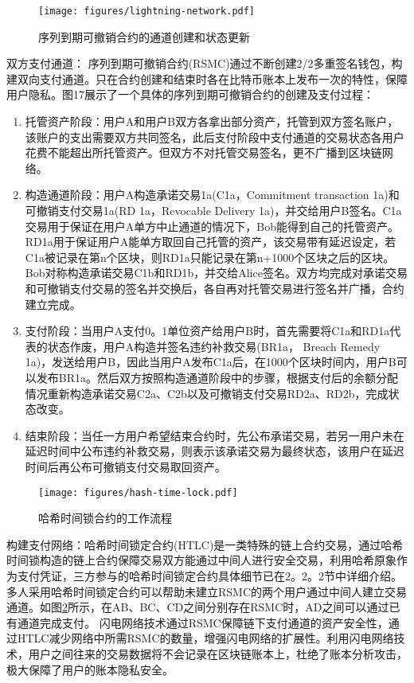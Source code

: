 \begin{figure}
\centering
\texttt{[image: figures/lightning-network.pdf]}
\caption{序列到期可撤销合约的通道创建和状态更新}
\label{fig:lightning-network}
\end{figure}

双方支付通道： 序列到期可撤销合约(RSMC)通过不断创建2/2多重签名钱包，构建双向支付通道。只在合约创建和结束时各在比特币账本上发布一次的特性，保障用户隐私。图17展示了一个具体的序列到期可撤销合约的创建及支付过程：

\begin{enumerate}
	\item 托管资产阶段：用户A和用户B双方各拿出部分资产，托管到双方签名账户，该账户的支出需要双方共同签名，此后支付阶段中支付通道的交易状态各用户花费不能超出所托管资产。但双方不对托管交易签名，更不广播到区块链网络。
	\item 构造通道阶段：用户A构造承诺交易1a(C1a，Commitment transaction 1a)和可撤销支付交易1a(RD 1a，Revocable Delivery 1a)，并交给用户B签名。C1a交易用于保证在用户A单方中止通道的情况下，Bob能得到自己的托管资产。RD1a用于保证用户A能单方取回自己托管的资产，该交易带有延迟设定，若C1a被记录在第n个区块，则RD1a只能记录在第n+1000个区块之后的区块。Bob对称构造承诺交易C1b和RD1b，并交给Alice签名。双方均完成对承诺交易和可撤销支付交易的签名并交换后，各自再对托管交易进行签名并广播，合约建立完成。
	\item 支付阶段：当用户A支付0。1单位资产给用户B时，首先需要将C1a和RD1a代表的状态作废，用户A构造并签名违约补救交易(BR1a， Breach Remedy 1a)，发送给用户B，因此当用户A发布C1a后，在1000个区块时间内，用户B可以发布BR1a。然后双方按照构造通道阶段中的步骤，根据支付后的余额分配情况重新构造承诺交易C2a、C2b以及可撤销支付交易RD2a、RD2b，完成状态改变。
	\item 结束阶段：当任一方用户希望结束合约时，先公布承诺交易，若另一用户未在延迟时间中公布违约补救交易，则表示该承诺交易为最终状态，该用户在延迟时间后再公布可撤销支付交易取回资产。
\end{enumerate}

\begin{figure}
\centering
\texttt{[image: figures/hash-time-lock.pdf]}
\caption{哈希时间锁合约的工作流程}
\label{fig:hash-time-lock}
\end{figure}

构建支付网络：哈希时间锁定合约(HTLC)是一类特殊的链上合约交易，通过哈希时间锁构造的链上合约保障交易双方能通过中间人进行安全交易，利用哈希原象作为支付凭证，三方参与的哈希时间锁定合约具体细节已在2。2。2节中详细介绍。多人采用哈希时间锁定合约可以帮助未建立RSMC的两个用户通过中间人建立交易通道。如图\ref{fig:hash-time-lock}所示，在AB、BC、CD之间分别存在RSMC时，AD之间可以通过已有通道完成支付。
闪电网络技术通过RSMC保障链下支付通道的资产安全性，通过HTLC减少网络中所需RSMC的数量，增强闪电网络的扩展性。利用闪电网络技术，用户之间往来的交易数据将不会记录在区块链账本上，杜绝了账本分析攻击，极大保障了用户的账本隐私安全。

